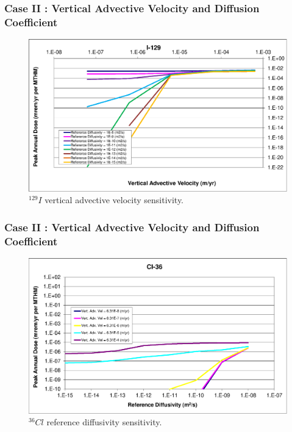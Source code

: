 \begin{frame}[c]
  \frametitle{Case II : Vertical Advective Velocity and Diffusion Coefficient}

\begin{figure}[ht!]
\centering
\includegraphics[width=\linewidth]{AdvVelAndDiffCoeffEBSFail/I-129-VAdvVel.eps}
\caption{$^{129}I$ vertical advective velocity sensitivity.}
\label{fig:VAdvVelI129VAdvVel}
\end{figure}
\end{frame}


\begin{frame}[c]
  \frametitle{Case II : Vertical Advective Velocity and Diffusion Coefficient}

\begin{figure}[htp!]
\centering
\includegraphics[width=\textwidth]{AdvVelAndDiffCoeffEBSFail/Cl-36.eps}
\caption{$^{36}Cl$ reference diffusivity sensitivity.}
\label{fig:VAdvVelCl36}
\end{figure}
\end{frame}



